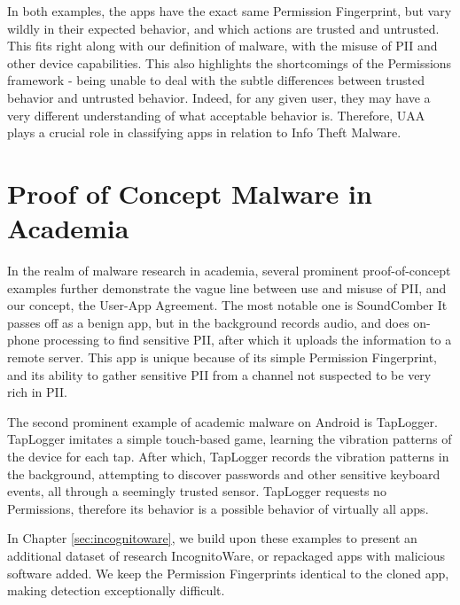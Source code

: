 In both examples, the apps have the exact same Permission Fingerprint, but vary wildly in their expected behavior, and which actions are trusted and untrusted. This fits right along with our definition of malware, with the misuse of PII and other device capabilities. This also highlights the shortcomings of the Permissions framework - being unable to deal with the subtle differences between trusted behavior and untrusted behavior. Indeed, for any given user, they may have a very different understanding of what acceptable behavior is. Therefore, UAA plays a crucial role in classifying apps in relation to Info Theft Malware.

\section{Proof of Concept Malware in Academia}
In the realm of malware research in academia, several prominent proof-of-concept examples further demonstrate the vague line between use and misuse of PII, and our concept, the User-App Agreement. The most notable one is SoundComber\citep{schlegel2011soundcomber} It passes off as a benign app, but in the background records audio, and does on-phone processing to find sensitive PII, after which it uploads the information to a remote server. This app is unique because of its simple Permission Fingerprint, and its ability to gather sensitive PII from a channel not suspected to be very rich in PII.

The second prominent example of academic malware on Android is TapLogger\citep{xu2012taplogger}. TapLogger imitates a simple touch-based game, learning the vibration patterns of the device for each tap. After which, TapLogger records the vibration patterns in the background, attempting to discover passwords and other sensitive keyboard events, all through a seemingly trusted sensor. TapLogger requests no Permissions, therefore its behavior is a possible behavior of virtually all apps. 

In Chapter \ref{sec:incognitoware}, we build upon these examples to present an additional dataset of research IncognitoWare, or repackaged apps with malicious software added. We keep the Permission Fingerprints identical to the cloned app, making detection exceptionally difficult. 

